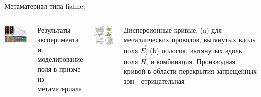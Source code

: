 \documentclass[9pt, compress, xcolor=table]{beamer}
\begin{document}
\begin{frame}{Метаматериал типа fishnet}

\begin{columns}[c]
\column{6cm}
\begin{center}
\includegraphics[width=6cm]{neg_ref_26}
\end{center}
Результаты эксперимента и моделирование поля в призме из метаматериала

\column{6cm}
\begin{center}
\includegraphics[width=5cm]{neg_ref_26a}
\end{center}

Дисперсионные кривые: (a) для металлических проводов, вытянутых вдоль поля $\vec E$, (b)
полосок, вытянутых вдоль поля $\vec H$, и комбинация. Производная кривой в области перекрытия
запрещенных зон - отрицательная
\end{columns}

\end{frame}
\end{document}

